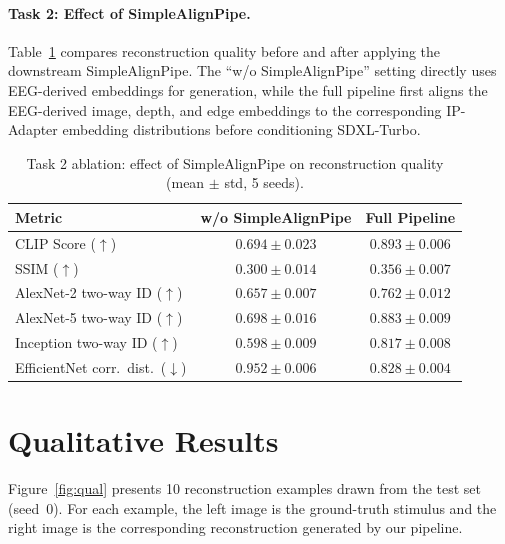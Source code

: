 \documentclass[11pt]{article}
\begin{document}
\paragraph{Task 2: Effect of SimpleAlignPipe.}
Table~\ref{tab:ablation_task2} compares reconstruction quality before and after applying the downstream SimpleAlignPipe.
The ``w/o SimpleAlignPipe'' setting directly uses EEG-derived embeddings for generation, while the full pipeline first aligns the EEG-derived image, depth, and edge embeddings to the corresponding IP-Adapter embedding distributions before conditioning SDXL-Turbo.

\begin{table}[H]
\centering
\caption{Task 2 ablation: effect of SimpleAlignPipe on reconstruction quality (mean $\pm$ std, 5 seeds).}
\label{tab:ablation_task2}
\setlength{\tabcolsep}{4pt}
\begin{tabular}{lcc}
\toprule
\textbf{Metric} & \textbf{w/o SimpleAlignPipe} & \textbf{Full Pipeline} \\
\midrule
CLIP Score ($\uparrow$)             & $0.694 \pm 0.023$ & $\mathbf{0.893 \pm 0.006}$ \\
SSIM ($\uparrow$)                   & $0.300 \pm 0.014$ & $\mathbf{0.356 \pm 0.007}$ \\
AlexNet-2 two-way ID ($\uparrow$)   & $0.657 \pm 0.007$ & $\mathbf{0.762 \pm 0.012}$ \\
AlexNet-5 two-way ID ($\uparrow$)   & $0.698 \pm 0.016$ & $\mathbf{0.883 \pm 0.009}$ \\
Inception two-way ID ($\uparrow$)   & $0.598 \pm 0.009$ & $\mathbf{0.817 \pm 0.008}$ \\
EfficientNet corr.\ dist.\ ($\downarrow$) & $0.952 \pm 0.006$ & $\mathbf{0.828 \pm 0.004}$ \\
\bottomrule
\end{tabular}
\end{table}

\section{Qualitative Results}

Figure~\ref{fig:qual} presents 10 reconstruction examples drawn from the test set (seed~0).
For each example, the left image is the ground-truth stimulus and the right image is the corresponding reconstruction generated by our pipeline.
\end{document}
